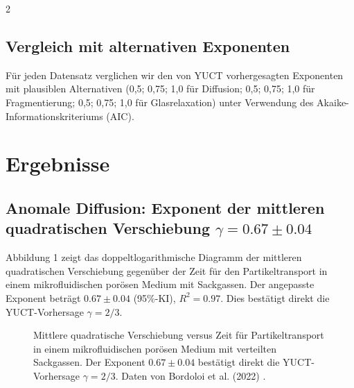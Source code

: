 \documentclass[11pt,a4paper]{article}
\begin{document}
\begin{multicols}{2}
		\subsection{Vergleich mit alternativen Exponenten}
		Für jeden Datensatz verglichen wir den von YUCT vorhergesagten Exponenten mit plausiblen Alternativen (0,5; 0,75; 1,0 für Diffusion; 0,5; 0,75; 1,0 für Fragmentierung; 0,5; 0,75; 1,0 für Glasrelaxation) unter Verwendung des Akaike-Informationskriteriums (AIC).
		
		\section{Ergebnisse}
		
		\subsection{Anomale Diffusion: Exponent der mittleren quadratischen Verschiebung \(\gamma = 0.67 \pm 0.04\)}
		
		Abbildung 1 zeigt das doppeltlogarithmische Diagramm der mittleren quadratischen Verschiebung gegenüber der Zeit für den Partikeltransport in einem mikrofluidischen porösen Medium mit Sackgassen. Der angepasste Exponent beträgt \(0.67 \pm 0.04\) (95\%-KI), \(R^2 = 0.97\). Dies bestätigt direkt die YUCT-Vorhersage \(\gamma = 2/3\).
		
		\begin{figure}[htbp]
			\centering
			\caption{Mittlere quadratische Verschiebung versus Zeit für Partikeltransport in einem mikrofluidischen porösen Medium mit verteilten Sackgassen. Der Exponent \(0.67 \pm 0.04\) bestätigt direkt die YUCT-Vorhersage \(\gamma = 2/3\). Daten von Bordoloi et al. (2022) \cite{Bordoloi2022}.}
			\label{fig:diffusion}
		\end{figure}
		

\end{multicols}
\end{document}
